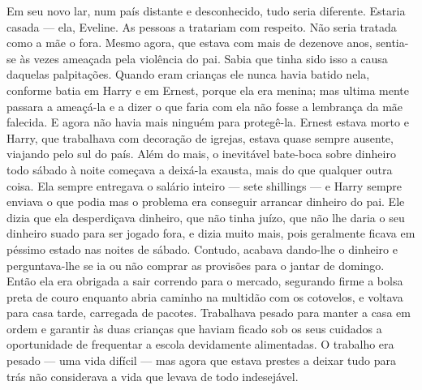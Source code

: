 Em seu novo lar, num país distante e desconhecido, tudo seria
diferente. Estaria casada --- ela, Eveline. As pessoas a tratariam com
respeito. Não seria tratada como a mãe o fora. Mesmo agora, que estava
com mais de dezenove anos, sentia-se às vezes ameaçada pela
violência do pai. Sabia que tinha sido isso a causa daquelas
palpitações. Quando eram crianças ele nunca havia batido nela,
conforme batia em Harry e em Ernest, porque ela era menina; mas ultima
mente passara a ameaçá-la e a dizer o que faria com ela não fosse a
lembrança da mãe falecida. E agora não havia mais ninguém para
protegê-la. Ernest estava morto e Harry, que
trabalhava com decoração de igrejas, estava quase sempre ausente,
viajando pelo sul do país. Além do mais, o inevitável bate-boca sobre
dinheiro todo sábado à noite começava a deixá-la exausta, mais do que
qualquer outra coisa. Ela sempre entregava o salário inteiro --- sete
shillings --- e Harry sempre enviava o que podia mas o problema era
conseguir arrancar dinheiro do pai. Ele dizia que ela desperdiçava
dinheiro, que não tinha juízo, que não lhe daria o seu dinheiro suado
para ser jogado fora, e dizia muito mais, pois geralmente ficava em
péssimo estado nas noites de sábado. Contudo, acabava dando-lhe o
dinheiro e perguntava-lhe se ia ou não comprar as provisões para o
jantar de domingo. Então ela era obrigada a sair correndo para o
mercado, segurando firme a bolsa preta de couro enquanto abria caminho
na multidão com os cotovelos, e voltava para casa tarde, carregada de
pacotes. Trabalhava pesado para manter a casa em ordem e garantir às
duas crianças que haviam ficado sob os seus cuidados a oportunidade
de frequentar a escola devidamente alimentadas. O trabalho era
pesado --- uma vida difícil --- mas agora que estava prestes a deixar
tudo para trás não considerava a vida que levava de todo indesejável.

